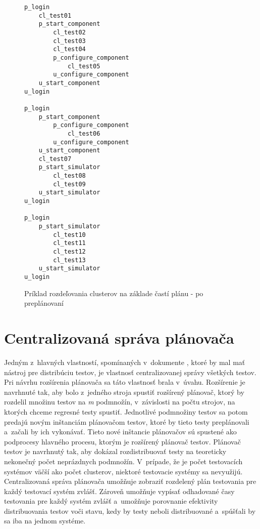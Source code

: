\begin{figure}[h]
\begin{lstlisting}
p_login
    cl_test01
    p_start_component
        cl_test02
        cl_test03
        cl_test04
        p_configure_component
            cl_test05
        u_configure_component
    u_start_component
u_login

p_login
    p_start_component
        p_configure_component
            cl_test06
        u_configure_component
    u_start_component
    cl_test07
    p_start_simulator
        cl_test08
        cl_test09
    u_start_simulator
u_login

p_login
    p_start_simulator
        cl_test10
        cl_test11
        cl_test12
        cl_test13
    u_start_simulator
u_login
\end{lstlisting}
\caption{Príklad rozdeľovania clusterov na základe častí plánu - po preplánovaní}
\label{obrazok:distribucia_casti_po_preplanovani}
\end{figure}
 

\section{Centralizovaná správa plánovača}
\label{sekcia:centralizovana_sprava}
Jedným z~hlavných vlastností, spomínaných v~dokumente \cite{Parallel_approach}, ktoré by mal mať nástroj pre distribúciu testov,
je vlastnosť centralizovanej správy všetkých testov. 
Pri návrhu rozšírenia plánovača sa táto vlastnosť brala v~úvahu. 
Rozšírenie je navrhnuté tak, aby bolo z~jedného stroja spustiť rozšírený plánovač, ktorý by rozdelil množinu testov na \emph{m} 
podmnožín, v~závislosti na počtu strojov, na ktorých chceme regresné testy spustiť. Jednotlivé podmnožiny testov sa 
potom predajú novým inštanciám plánovačom testov, ktoré by tieto testy preplánovali a~začali by ich vykonávať. 
Tieto nové inštancie plánovačov sú spustené ako podprocesy hlavného procesu, ktorým je rozšírený plánovač testov.
Plánovač testov je navrhnutý tak, aby dokázal rozdistribuovať testy na teoreticky nekonečný počet neprázdnych podmnožín.
V~prípade, že je počet testovacích systémov väčší ako počet clusterov, niektoré testovacie systémy sa nevyužijú.
Centralizovaná správa plánovača umožňuje zobraziť rozdelený plán testovania pre každý testovací systém zvlášť.
Zároveň umožňuje vypísať odhadované časy testovania pre každý systém zvlášť a~umožňuje porovnanie efektivity distribuovania testov voči stavu,
kedy by testy neboli distribuované a~spúšťali by sa iba na jednom systéme. 

